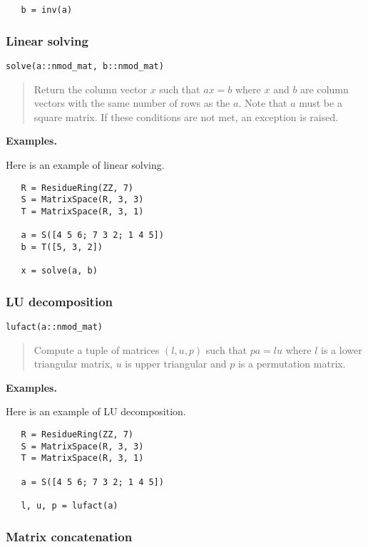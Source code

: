 \documentclass[a4paper,10pt]{article}
\newcommand{\desc}[1]{\vspace{-3mm}\begin{quote}#1\end{quote}}
\begin{document}
{{\begin{lstlisting}
   b = inv(a)
\end{lstlisting}

\subsubsection{Linear solving}

\begin{lstlisting}
solve(a::nmod_mat, b::nmod_mat)
\end{lstlisting}

\desc{Return the column vector $x$ such that $ax = b$ where $x$ and $b$ are column
vectors with the same number of rows as the $a$. Note that $a$ must be a square
matrix. If these conditions are not met, an exception is raised.}

\textbf{Examples.}

Here is an example of linear solving.

\begin{lstlisting}
   R = ResidueRing(ZZ, 7)
   S = MatrixSpace(R, 3, 3)
   T = MatrixSpace(R, 3, 1)

   a = S([4 5 6; 7 3 2; 1 4 5])
   b = T([5, 3, 2])

   x = solve(a, b)
\end{lstlisting}

\subsubsection{LU decomposition}

\begin{lstlisting}
lufact(a::nmod_mat)
\end{lstlisting}

\desc{Compute a tuple of matrices $(l, u, p)$ such that $pa = lu$ where $l$ is a
lower triangular matrix, $u$ is upper triangular and $p$ is a permutation matrix.}

\textbf{Examples.}

Here is an example of LU decomposition.

\begin{lstlisting}
   R = ResidueRing(ZZ, 7)
   S = MatrixSpace(R, 3, 3)
   T = MatrixSpace(R, 3, 1)

   a = S([4 5 6; 7 3 2; 1 4 5])
  
   l, u, p = lufact(a)
\end{lstlisting}

\subsubsection{Matrix concatenation}

}}
\end{document}
